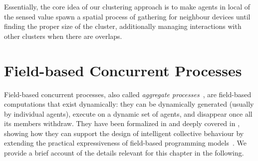 %
%
%
%
%

Essentially, the core idea of our clustering approach is to make agents
 in local  of the sensed value  spawn a spatial process of gathering for neighbour devices until finding the proper size of the cluster,
 additionally managing interactions with other clusters when there are overlaps.
%

\label{s:background}

\section{Field-based Concurrent Processes}
\sloppy
Field-based concurrent processes, also called \emph{aggregate processes}~\cite{DBLP:conf/coordination/CasadeiVAPD19,DBLP:journals/eaai/CasadeiVAPD21},
 are field-based computations
 that exist dynamically:
 they can be dynamically generated (usually by individual agents),
 execute on a dynamic set of agents,
 and disappear once all its members withdraw.
%
They have been formalized in \cite{DBLP:conf/coordination/CasadeiVAPD19}
 and deeply covered in \cite{DBLP:journals/eaai/CasadeiVAPD21},
 showing how they can support the design of intelligent collective behaviour by extending the practical expressiveness of field-based programming models~\cite{DBLP:journals/jlap/ViroliBDACP19}.
%
We provide a brief account of the details relevant for this chapter in the following.

